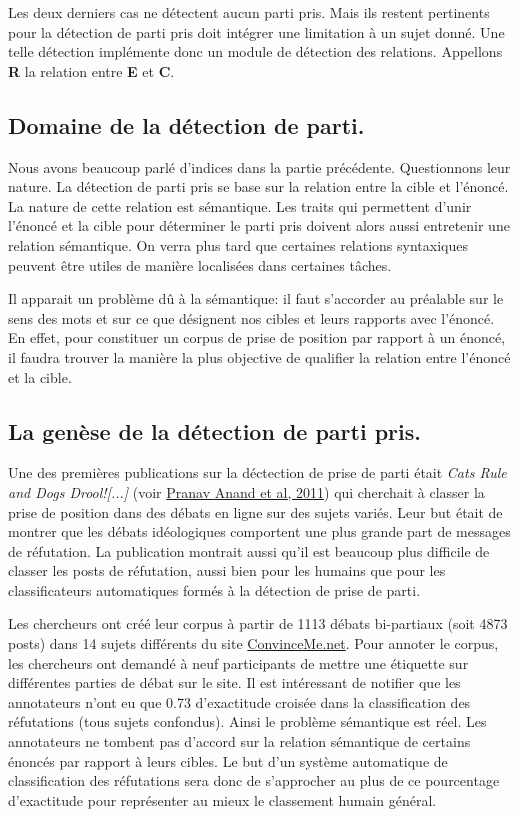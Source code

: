 \documentclass[onecolumn, 12pt]{article}
\begin{document}
Les deux derniers cas ne détectent aucun parti pris.
Mais ils restent pertinents pour la détection de parti pris doit intégrer une limitation à un sujet donné.
Une telle détection implémente donc un module de détection des relations.
Appellons \textbf{R} la relation entre \textbf{E} et \textbf{C}.


\subsection{Domaine de la détection de parti.}
Nous avons beaucoup parlé d'indices dans la partie précédente.
Questionnons leur nature.
La détection de parti pris se base sur la relation entre la cible et l'énoncé.
La nature de cette relation est sémantique.
Les traits qui permettent d'unir l'énoncé et la cible pour déterminer le parti pris doivent alors aussi entretenir une relation sémantique.
On verra plus tard que certaines relations syntaxiques peuvent être utiles de manière localisées dans certaines tâches.

Il apparait un problème dû à la sémantique: il faut s'accorder au préalable sur le sens des mots et sur ce que désignent nos cibles et leurs rapports avec l'énoncé.
En effet, pour constituer un corpus de prise de position par rapport à un énoncé, il faudra trouver la manière la plus objective de qualifier la relation entre l'énoncé et la cible.
\subsection{La genèse de la détection de parti pris.}

Une des premières publications sur la déctection de prise de parti était \og  \textit{Cats Rule and Dogs Drool![...]} \fg (voir \href{http://www.aclweb.org/anthology/W11-1701}{Pranav Anand et al, 2011}) qui cherchait à classer la prise de position dans des débats en ligne sur des sujets variés.
Leur but était de montrer que les débats idéologiques comportent une plus grande part de messages de réfutation.
La publication montrait aussi qu'il est beaucoup plus difficile de classer les posts de réfutation, aussi bien pour les humains que pour les classificateurs automatiques formés à la détection de prise de parti.

Les chercheurs ont créé leur corpus à partir de 1113 débats bi-partiaux (soit 4873 posts) dans 14 sujets différents du site \href{http://www.convinceme.net/}{ConvinceMe.net}.
Pour annoter le corpus, les chercheurs ont demandé à neuf participants de mettre une étiquette sur différentes parties de débat sur le site.
Il est intéressant de notifier que les annotateurs  n'ont eu que 0.73 d'exactitude croisée dans la classification des réfutations (tous sujets confondus).
Ainsi le problème sémantique est réel.
Les annotateurs ne tombent pas d'accord sur la relation sémantique de certains énoncés par rapport à leurs cibles.
Le but d'un système automatique de classification des réfutations sera donc de s'approcher au plus de ce pourcentage d'exactitude pour représenter au mieux le classement humain général.
\end{document}
